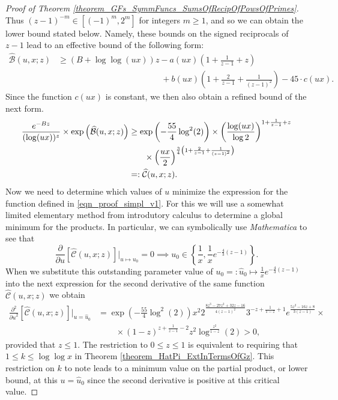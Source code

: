 \documentclass[11pt,reqno,a4letter]{article}
\numberwithin{figure}{section}
\numberwithin{table}{section}
\theoremstyle{plain}
\numberwithin{theorem}{section}
\theoremstyle{definition}
\begin{document}
\begin{proof}[Proof of Theorem \ref{theorem_GFs_SymmFuncs_SumsOfRecipOfPowsOfPrimes}]
Thus $(z-1)^{-m} \in [(-1)^m, 2^m]$ for integers $m \geq 1$, and so we can obtain the 
lower bound stated below. Namely, these bounds on the signed reciprocals of $z-1$ 
lead to an effective bound of the following form: 
\begin{align*} 
\widehat{\mathcal{B}}(u, x; z) & \geq (B + \log\log (ux)) z - a(ux) \left(1 + \frac{1}{z-1} + z\right) \\ 
     & \phantom{= (B + \log\log (ux)) z\ } + 
     b(ux) \left( 
     1 + \frac{2}{z-1} + \frac{1}{(z-1)^2}\right) - 
     45 \cdot c(ux). 
\end{align*} 
Since the function $c(ux)$ is constant, we then also obtain a refined bound of the next form. 
\begin{align} 
\notag 
\frac{e^{-Bz}}{(\log (ux))^{z}} \times \exp\left(\widehat{\mathcal{B}}(u, x; z)\right) & \geq 
    \exp\left(-\frac{55}{4} \log^2(2)\right) \times \left(\frac{\log(ux)}{\log 2}\right)^{1 + \frac{1}{z-1} + z} \\ 
\notag 
    & \phantom{\geq \times} \times \left(\frac{ux}{2}\right)^{\frac{3}{4}\left(1 + \frac{2}{z-1} + \frac{1}{(z-1)^2}\right)} \\ 
\label{eqn_proof_simpl_v1} 
     & =: \widehat{\mathcal{C}}(u, x; z). 
\end{align} 
Now we need to determine which values of $u$ minimize the expression for the function defined 
in \eqref{eqn_proof_simpl_v1}. 
For this we will use a somewhat limited elementary method from 
introdutory calculus to determine a global minimum for the products. 
In particular, we can symbolically use \emph{Mathematica} to see that 
\[
\frac{\partial}{\partial u}\left[\widehat{\mathcal{C}}(u, x; z)\right] \Biggr\rvert_{u \mapsto u_0} = 0 \implies 
     u_0 \in \left\{\frac{1}{x}, \frac{1}{x} e^{-\frac{4}{3}(z-1)}\right\}. 
\]
When we substitute this outstanding parameter value of $u_0 =: \hat{u}_0 \mapsto \frac{1}{x} e^{-\frac{4}{3}(z-1)}$ 
into the next expression for the second derivative of the same function 
$\widehat{\mathcal{C}}(u, x; z)$ we obtain 
\begin{align*} 
\frac{\partial^2}{{\partial u}^2}\left[\widehat{\mathcal{C}}(u, x; z)\right] \Biggr\rvert_{u = \hat{u}_0} & = 
     \exp\left(-\frac{55}{4} \log^2(2)\right) x^2 2^{\frac{8 z^3-27 z^2+32 z-16}{4 (z-1)^2}} 
     3^{-z+\frac{1}{1-z}+1} e^{\frac{5 z^2-16 z+8}{3 (z-1)}} \times \\ 
     & \phantom{=\times} \times (1-z)^{z+\frac{1}{z-1}-2} z^2
     \log^{\frac{z^2}{1-z}}(2) > 0, 
\end{align*} 
provided that $z \leq 1$. 
The restriction to $0 \leq z \leq 1$ is equivalent to requiring that 
$1 \leq k \leq \log\log x$ in Theorem \ref{theorem_HatPi_ExtInTermsOfGz}. 
This restriction on $k$ to note 
leads to a minimum value on the partial product, or lower bound, at this $u = \hat{u}_0$ 
since the second derivative is positive at this critical value. 


\end{proof}
\end{document}
